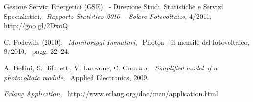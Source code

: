 \clearpage{\pagestyle{empty}\cleardoublepage}
\begin{thebibliography}{3}

 Gestore Servizi Energetici (GSE) \
  - Direzione Studi, Statistiche e Servizi Specialistici, \
  \emph{Rapporto Statistico 2010 -- Solare Fotovoltaico}, 4/2011, 
  http://goo.gl/2DxoQ

 C. Podewils (2010), \
  \emph{Monitoraggi Immaturi}, \
  Photon - il mensile del fotovoltaico, 8/2010, \
  pagg. 22--24.

\bibitem{bellini09} A. Bellini, S. Bifaretti, V. Iacovone, C. Cornaro, \
  \emph{Simplified model of a photovoltaic module}, \
  Applied Electronics, 2009.


 \emph{Erlang Application}, \
  \mbox{http://www.erlang.org/doc/man/application.html}










\end{thebibliography}
